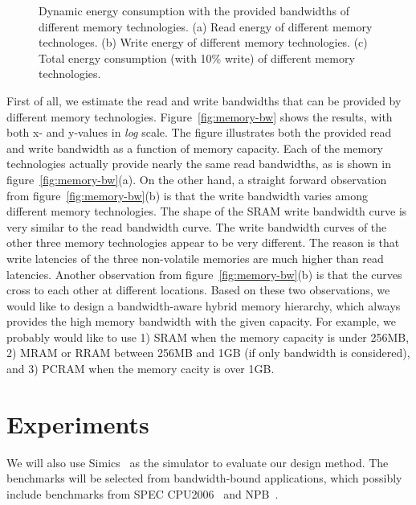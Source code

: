 \documentclass[10pt,letterpaper,singlecolumn]{article}
\begin{document}
\begin{large}
\begin{figure}[htbp]
\vspace*{-0.5in}
\hspace{0.02in}
\makebox[2in][l]{\textcolor [rgb]{0,0,0} {\bf (a)}}
\makebox[2in][l]{\textcolor [rgb]{0,0,0} {\bf (b)}}
\makebox[2in][l]{\textcolor [rgb]{0,0,0} {\bf (c)}}

\caption{Dynamic energy consumption with the provided bandwidths of different
  memory technologies. (a) Read energy of different memory technologes. (b)
  Write energy of different memory technologies. (c) Total energy consumption
  (with 10\% write) of different memory technologies.}
\label{fig:memory-energy}
\end{figure}

First of all, we estimate the read and write bandwidths that can be provided by
different memory technologies. Figure~\ref{fig:memory-bw} shows the results,
with both x- and y-values in \emph{log} scale. The figure illustrates both the
provided read and write bandwidth as a function of memory capacity. Each of the
memory technologies actually provide nearly the same read bandwidths, as is
shown in figure~\ref{fig:memory-bw}(a). On the other hand, a straight forward
observation from figure~\ref{fig:memory-bw}(b) is that the write bandwidth
varies among different memory technologies. The shape of the SRAM write
bandwidth curve is very similar to the read bandwidth curve. The write bandwidth
curves of the other three memory technologies appear to be very different. The
reason is that write latencies of the three non-volatile memories are much
higher than read latencies. Another observation from
figure~\ref{fig:memory-bw}(b) is that the curves cross to each other at
different locations. Based on these two observations, we would like to design a
bandwidth-aware hybrid memory hierarchy, which always provides the high memory
bandwidth with the given capacity. For example, we probably would like to use
1) SRAM when the memory capacity is under 256MB, 2) MRAM or RRAM between
256MB and 1GB (if only bandwidth is considered), and 3) PCRAM when the memory
cacity is over 1GB. 

\section{Experiments}

 We will also use
Simics~\cite{Magnusson:2002:simics-orig-paper} as the simulator to evaluate our
design method. The benchmarks will be selected from bandwidth-bound
applications, which possibly include benchmarks from SPEC
CPU2006~\cite{SPEC:2006} and NPB~\cite{NPB}.\vspace{0.15in}


\end{large}
\end{document}
